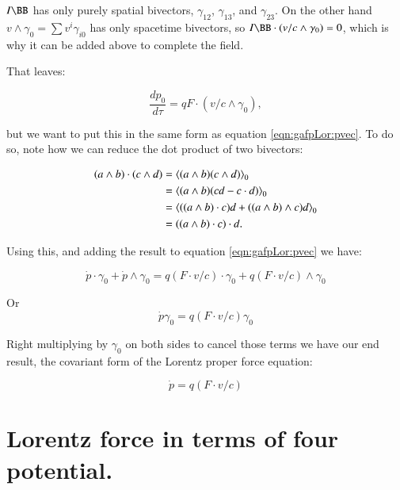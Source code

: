 $I\BB$ has only purely spatial bivectors, $\gamma_{12}$, $\gamma_{13}$, and $\gamma_{23}$.  On the other hand $v \wedge \gamma_0 = \sum v^i \gamma_{i0}$ has only spacetime bivectors, so $I\BB \cdot (v/c \wedge \gamma_0) = 0$, which is why it can be added above to complete the field.

That leaves:

\begin{equation}\label{eqn:gafpLor:p0wedgedotwedge}
\frac{dp_0}{d\tau} = q F \cdot \left(v/c \wedge \gamma_0\right),
\end{equation}

but we want to put this in the same form as equation \ref{eqn:gafpLor:pvec}.  To do so, note how we can reduce the dot product of two bivectors:

\begin{align*}
( a \wedge b ) \cdot ( c \wedge d )
&= {\left\langle{{ ( a \wedge b ) ( c \wedge d ) }}\right\rangle}_{0} \\
&= {\left\langle{{ ( a \wedge b ) ( c d - c \cdot d ) }}\right\rangle}_{0} \\
&= {\left\langle{{ (( a \wedge b ) \cdot c) d + (( a \wedge b ) \wedge c) d }}\right\rangle}_{0} \\
&= (( a \wedge b ) \cdot c) \cdot d .
\end{align*}

Using this, and adding the result to equation \ref{eqn:gafpLor:pvec} we have:

\begin{equation*}
\dot{p} \cdot \gamma_0 + \dot{p} \wedge \gamma_0 = q (F \cdot v/c) \cdot \gamma_0 + q ( F \cdot v/c ) \wedge \gamma_0
\end{equation*}

Or
\begin{equation*}
\dot{p} \gamma_0 = q (F \cdot v/c) \gamma_0
\end{equation*}

Right multiplying by $\gamma_0$ on both sides to cancel those terms we have our end result, the covariant form of the Lorentz proper force equation:

\begin{equation}\label{eqn:gafpLor:LorentzCovariant}
\dot{p} = q ( F \cdot v/c )
\end{equation}

\section{Lorentz force in terms of four potential. }

